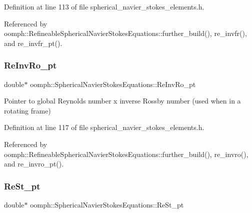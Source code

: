 Definition at line 113 of file spherical\+\_\+navier\+\_\+stokes\+\_\+elements.\+h.



Referenced by oomph\+::\+Refineable\+Spherical\+Navier\+Stokes\+Equations\+::further\+\_\+build(), re\+\_\+invfr(), and re\+\_\+invfr\+\_\+pt().

\mbox{\label{classoomph_1_1SphericalNavierStokesEquations_a71e5db6ef157796354a86a91694203cf}} 
\subsubsection{\texorpdfstring{Re\+Inv\+Ro\+\_\+pt}{ReInvRo\_pt}}
{\footnotesize\ttfamily double$\ast$ oomph\+::\+Spherical\+Navier\+Stokes\+Equations\+::\+Re\+Inv\+Ro\+\_\+pt\hspace{0.3cm}{\ttfamily [protected]}}



Pointer to global Reynolds number x inverse Rossby number (used when in a rotating frame) 



Definition at line 117 of file spherical\+\_\+navier\+\_\+stokes\+\_\+elements.\+h.



Referenced by oomph\+::\+Refineable\+Spherical\+Navier\+Stokes\+Equations\+::further\+\_\+build(), re\+\_\+invro(), and re\+\_\+invro\+\_\+pt().

\mbox{\label{classoomph_1_1SphericalNavierStokesEquations_a4312d4d7e7e51c89dea51c21acb6a89d}} 
\subsubsection{\texorpdfstring{Re\+St\+\_\+pt}{ReSt\_pt}}
{\footnotesize\ttfamily double$\ast$ oomph\+::\+Spherical\+Navier\+Stokes\+Equations\+::\+Re\+St\+\_\+pt\hspace{0.3cm}{\ttfamily [protected]}}




